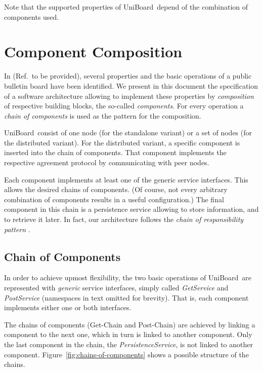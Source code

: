 \documentclass[oneside]{scrreprt}
\newcommand{\uniboard}{\mbox{UniBoard}}
\newcommand{\fig}[1]{Figure~\ref{#1}}
\begin{document}
Note that the supported properties of \uniboard\ depend of the combination of components used.

\chapter{Component Composition}

In (Ref.\ to be provided), several properties and the basic operations of a public bulletin
board have been identified. We present in this document the
specification of a software architecture allowing to implement
these properties by \emph{composition} of respective building
blocks, the so-called \emph{components}. For every operation a 
\emph{chain of components} is used as the pattern for the
composition.

\uniboard\ consist of one node (for the standalone variant) or
a set of nodes (for the distributed variant). For the
distributed variant, a specific component is inserted
into the chain of components. That component implements
the respective agreement protocol by communicating with
peer nodes.

Each component implements at least one of the generic service interfaces.
This allows the desired chains of components. (Of
course, not every arbitrary combination of components results
in a useful configuration.) The final component in this chain
is a persistence service allowing to store information, and
to retrieve it later. In fact, our architecture follows the
\emph{chain of responsibility pattern} \cite{Gamma:1995:DPE:186897}.


\section{Chain of Components}

In order to achieve upmost flexibility, the two basic operations of
\uniboard\ are represented with \emph{generic} service
interfaces, simply called \emph{GetService} and \emph{PostService} (namespaces in text
omitted for brevity). That is, each component
implements either one or both interfaces.

The chains of components (Get-Chain and Post-Chain) are achieved by linking a component
to the next one, which in turn is linked to another component.
Only the last component in the chain, the \emph{PersistenceService}, is not
linked to another component. \fig{fig:chains-of-components}
shows a possible structure of the chains. 
\end{document}
